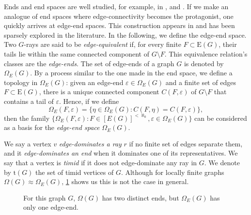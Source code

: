 \documentclass[10pt]{article}
\newcommand{\myref}[1]{\hyperref[#1]{\namecref{#1} \ref{#1}}}
\numberwithin{equation}{subsection}
\theoremstyle{remark}
\begin{document}
Ends and end spaces are well studied, for example, in \cite{Endspacesandspanningtrees}, \cite{representation} and \cite{pitz}. If we make an analogue of end spaces where edge-connectivity becomes the protagonist, one quickly arrives at edge-end spaces. This construction appears in \cite{lav} and has been sparsely explored in the literature. In the following, we define the edge-end space. Two $G$-rays are said to be \emph{edge-equivalent} if, for every finite $F\subset \mathrm{E}(G)$, their tails lie within the same connected component of $G\setminus F$. This equivalence relation's classes are the \emph{edge-ends}. The set of edge-ends of a graph $G$ is denoted by $\Omega_E(G)$. By a process similar to the one made in the end space, we define a topology in $\Omega_E(G)$: given an edge-end $\varepsilon\in \Omega_E (G)$ and a finite set of edges $F\subset \mathrm{E}(G)$, there is a unique connected component $C(F,\varepsilon)$ of $G\setminus F$ that contains a tail of $\varepsilon$. Hence, if we define $$\Omega_E(F,\varepsilon)=\lbrace \eta \in \Omega_E (G) : C(F, \eta) = C(F, \varepsilon) \rbrace ,$$ then the family $\lbrace \Omega_E (F, \varepsilon) : F\in [E(G)]^{<\aleph_0}, \varepsilon\in \Omega_E (G)\rbrace$ can be considered as a basis for the \emph{edge-end space} $\Omega_E (G)$. 

We say a vertex $v$ \emph{edge-dominates a ray} $r$ if no finite set of edges separate them, and it \emph{edge-dominates an end} when it dominates one of its representatives. We say that a vertex is \emph{timid} if it does not edge-dominate any ray in $G$. We denote by $\mathrm{t}(G)$ the set of timid vertices of $G$. Although for locally finite graphs $\Omega(G)\approx \Omega_E(G)$, \myref{nonadmissiblevertexset} shows us this is not the case in general.

\begin{figure}[ht]
\centering
{}
\caption{For this graph $G$, $\Omega(G)$ has two distinct ends, but $\Omega_E(G)$ has only one edge-end.}
\label{nonadmissiblevertexset}
\end{figure}
\end{document}
